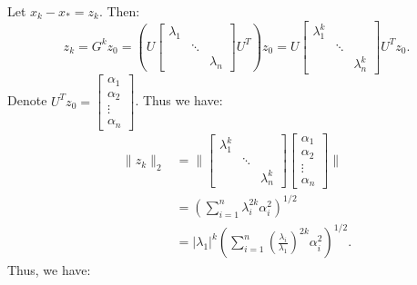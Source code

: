 \documentclass[../main/main.tex]{subfiles}
\begin{document}
Let $x_{k}- x_{*}= z_{k}$. Then: \[
z_{k} = G^{k} z_{0} = \left(U \begin{bmatrix}
  \lambda_{1} && \\
  & \ddots & \\
  && \lambda_{n}
\end{bmatrix}U^{T}\right)z_{0} =  U \begin{bmatrix}
  \lambda_{1}^{k} && \\
  & \ddots & \\
  && \lambda_{n}^{k}
\end{bmatrix}U^{T}z_{0}.
\] Denote $U^{T}z_{0}= \begin{bmatrix}
\alpha_{1} \\ \alpha_{2} \\ \vdots \\ \alpha_{n}
\end{bmatrix}$. Thus we have:
\begin{align*}
  \|z_{k}\|_{2} &= \|\begin{bmatrix}
  \lambda_{1}^{k} && \\
  & \ddots & \\
  && \lambda_{n}^{k}
\end{bmatrix}\begin{bmatrix}
\alpha_{1} \\ \alpha_{2} \\ \vdots \\ \alpha_{n}
\end{bmatrix}
  \|\\ &= \left(\sum_{i=1}^n \lambda_{i}^{2k}\alpha_{i}^2\right)^{1 /2}\\
                &= |\lambda_{1}|^{k}\left(\sum_{i=1}^n \left(\frac{\lambda_{i}}{\lambda_{1}} \right)^{2k}\alpha_{i}^2\right)^{1 /2}
  .\end{align*}
Thus, we have:
\end{document}
